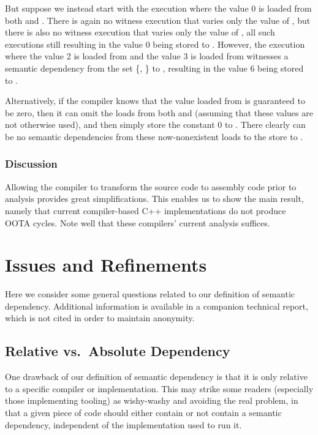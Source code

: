 But suppose we instead start with the execution where the value 0
is loaded from both  and .
There is again no witness execution that varies only the value of ,
but there is also no witness execution that varies only the value of ,
all such executions still resulting in the value 0 being stored to .
However, the execution where the value 2 is loaded from  and the
value 3 is loaded from  witnesses a semantic dependency from the
set \{, \} to , resulting in the value 6 being stored
to .

Alternatively, if the compiler knows that the value loaded from 
is guaranteed to be zero, then it can omit the loads from both 
and  (assuming that these values are not otherwise used), and
then simply store the constant 0 to .
There clearly can be no semantic dependencies from these now-nonexistent
loads to the store to .

\subsubsection{Discussion}
\label{sec:Discussion}

Allowing the compiler to transform the source code to assembly code
prior to analysis provides great simplifications.
This enables us to show the main result, namely that current compiler-based
C++ implementations do not produce OOTA cycles.
Note well that these compilers' current analysis suffices.

\section{Issues and Refinements}
\label{sec:Issues and Refinements}

Here we consider some general questions related to our definition of
semantic dependency.
Additional information is available in a companion technical report,
which is not cited in order to maintain anonymity.

\subsection{Relative vs.\ Absolute Dependency}
\label{sec:Relative vs. Absolute Dependency}

One drawback of our definition of semantic dependency is that it is only
relative to a specific compiler or implementation.
This may strike some readers (especially those implementing tooling)
as wishy-washy and avoiding the real problem, in that a given piece
of code should either contain or not contain a semantic dependency,
independent of the implementation used to run it.

